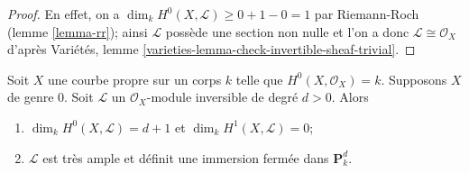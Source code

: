 \begin{proof}
En effet, on a $\dim_k H^0(X, \mathcal{L}) \geq 0 + 1 - 0 = 1$ par Riemann-Roch (lemme \ref{lemma-rr}); ainsi $\mathcal{L}$ possède une section non nulle et l'on a donc $\mathcal{L} \cong \mathcal{O}_X$ d'après Variétés, lemme \ref{varieties-lemma-check-invertible-sheaf-trivial}.
\end{proof}

\begin{lemma}
\label{lemma-genus-zero-positive-degree}
Soit $X$ une courbe propre sur un corps $k$ telle que $H^0(X, \mathcal{O}_X) = k$. Supposons $X$ de genre $0$. Soit $\mathcal{L}$ un $\mathcal{O}_X$-module inversible de degré $d > 0$. Alors \begin{enumerate} \item $\dim_k H^0(X, \mathcal{L}) = d + 1$ et $\dim_k H^1(X, \mathcal{L}) = 0$; \item $\mathcal{L}$ est très ample et définit une immersion fermée dans $\mathbf{P}^d_k$.
\end{enumerate}
\end{lemma}

